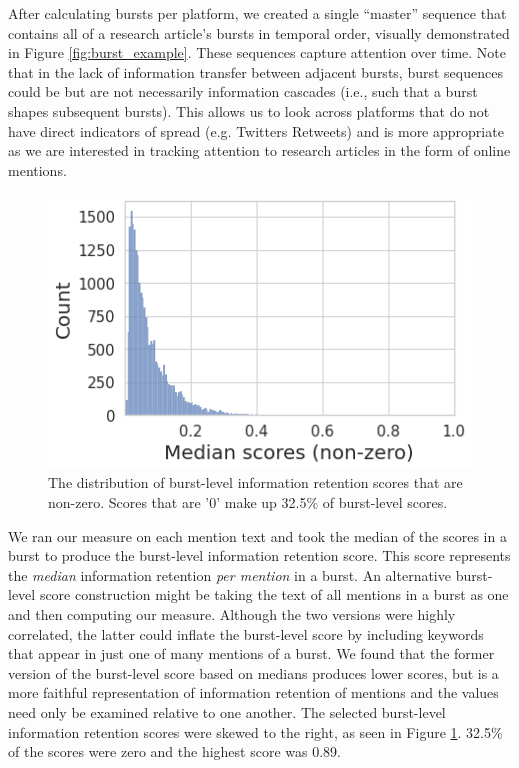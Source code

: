 \documentclass[letterpaper]{article} %
\begin{document}
After calculating bursts per platform, we created a single ``master'' sequence that contains all of a research article's bursts in temporal order, visually demonstrated in Figure \ref{fig:burst_example}. These sequences capture attention over time. Note that in the lack of information transfer between adjacent bursts, burst sequences could be but are not necessarily information cascades (i.e., such that a burst shapes subsequent bursts). This allows us to look across platforms that do not have direct indicators of spread (e.g. Twitters Retweets) and is more appropriate as we are interested in tracking attention to research articles in the form of online mentions.

\begin{figure}[t]
\centering
\includegraphics[width=0.85\columnwidth]{figs/fig2.png}
\caption{The distribution of burst-level information retention scores that are non-zero. Scores that are '0' make up 32.5\% of burst-level scores.}
\label{fig:score_distribution}
\end{figure}

We ran our measure on each mention text and took the median of the scores in a burst to produce the burst-level information retention score. This score represents the \textit{median} information retention \textit{per mention} in a burst. An alternative burst-level score construction might be taking the text of all mentions in a burst as one and then computing our measure. Although the two versions were highly correlated, the latter could inflate the burst-level score by including keywords that appear in just one of many mentions of a burst. We found that the former version of the burst-level score based on medians produces lower scores, but is a more faithful representation of information retention of mentions and the values need only be examined relative to one another.
The selected burst-level information retention scores were skewed to the right, as seen in Figure \ref{fig:score_distribution}. 32.5\% of the scores were zero and the highest score was 0.89.
\end{document}

